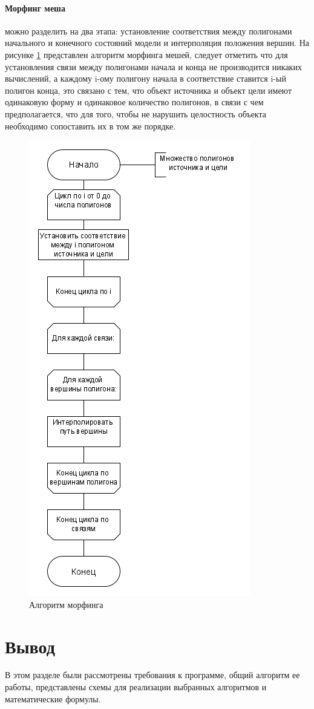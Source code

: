 \paragraph{Морфинг меша} можно разделить на два этапа: установление соответствия между полигонами начального и конечного состояний модели и интерполяция положения вершин. На рисунке \ref{fig:morphingalg} представлен алгоритм морфинга мешей, следует отметить что для установления связи между полигонами начала и конца не производится никаких вычислений, а каждому i-ому полигону начала в соответствие ставится i-ый полигон конца, это связано с тем, что объект источника и объект цели имеют одинаковую форму и одинаковое количество полигонов, в связи с чем предполагается, что для того, чтобы не нарушить целостность объекта необходимо сопоставить их в том же порядке.
\begin{figure}[H]
	\centering
	\includegraphics[width=0.7\linewidth]{images/morphing_alg}
	\caption[Алгоритм морфинга]{Алгоритм морфинга}
	\label{fig:morphingalg}
\end{figure}

\section{Вывод}
\label{sec:conc_constr}
В этом разделе были рассмотрены требования к программе, общий алгоритм ее работы, представлены схемы для реализации выбранных алгоритмов и математические формулы.
